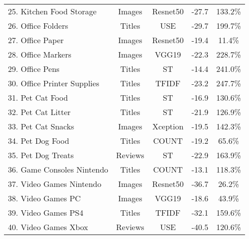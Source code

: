 \begin{tabular}{p{6cm}cccc}
25. Kitchen Food Storage & Images & Resnet50 & -27.7 & 133.2\% \\
26. Office Folders & Titles & USE & -29.7 & 199.7\% \\
27. Office Paper & Images & Resnet50 & -19.4 & 11.4\% \\
28. Office Markers & Images & VGG19 & -22.3 & 228.7\% \\
29. Office Pens & Titles & ST & -14.4 & 241.0\% \\
30. Office Printer Supplies & Titles & TFIDF & -23.2 & 247.7\% \\
31. Pet Cat Food & Titles & ST & -16.9 & 130.6\% \\
32. Pet Cat Litter & Titles & ST & -21.9 & 126.9\% \\
33. Pet Cat Snacks & Images & Xception & -19.5 & 142.3\% \\
34. Pet Dog Food & Titles & COUNT & -19.2 & 65.6\% \\
35. Pet Dog Treats & Reviews & ST & -22.9 & 163.9\% \\
36. Game Consoles Nintendo & Titles & COUNT & -13.1 & 118.3\% \\
37. Video Games Nintendo & Images & Resnet50 & -36.7 & 26.2\% \\
38. Video Games PC & Images & VGG19 & -18.6 & 43.9\% \\
39. Video Games PS4 & Titles & TFIDF & -32.1 & 159.6\% \\
40. Video Games Xbox & Reviews & USE & -40.5 & 120.6\% \\
\bottomrule
\end{tabular}